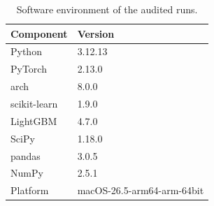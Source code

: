 \begin{table}[!htbp]
\centering
\small
\caption{Software environment of the audited runs.}
\label{tab:env}
\begin{tabularx}{\linewidth}{lX}
\toprule
\textbf{Component} & \textbf{Version} \\
\midrule
Python & 3.12.13 \\
PyTorch & 2.13.0 \\
arch & 8.0.0 \\
scikit-learn & 1.9.0 \\
LightGBM & 4.7.0 \\
SciPy & 1.18.0 \\
pandas & 3.0.5 \\
NumPy & 2.5.1 \\
Platform & macOS-26.5-arm64-arm-64bit \\
\bottomrule
\end{tabularx}
\end{table}
